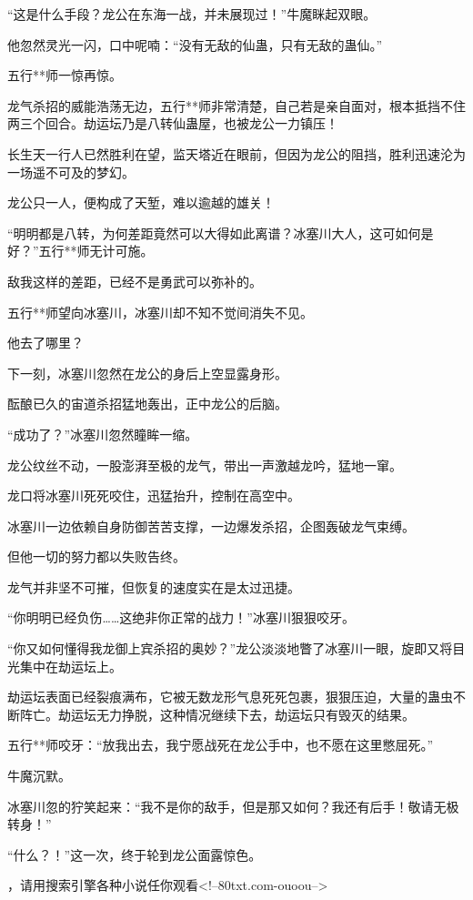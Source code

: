 \begin{this_body}
“这是什么手段？龙公在东海一战，并未展现过！”牛魔眯起双眼。

他忽然灵光一闪，口中呢喃：“没有无敌的仙蛊，只有无敌的蛊仙。”

五行**师一惊再惊。

龙气杀招的威能浩荡无边，五行**师非常清楚，自己若是亲自面对，根本抵挡不住两三个回合。劫运坛乃是八转仙蛊屋，也被龙公一力镇压！

长生天一行人已然胜利在望，监天塔近在眼前，但因为龙公的阻挡，胜利迅速沦为一场遥不可及的梦幻。

龙公只一人，便构成了天堑，难以逾越的雄关！

“明明都是八转，为何差距竟然可以大得如此离谱？冰塞川大人，这可如何是好？”五行**师无计可施。

敌我这样的差距，已经不是勇武可以弥补的。

五行**师望向冰塞川，冰塞川却不知不觉间消失不见。

他去了哪里？

下一刻，冰塞川忽然在龙公的身后上空显露身形。

酝酿已久的宙道杀招猛地轰出，正中龙公的后脑。

“成功了？”冰塞川忽然瞳眸一缩。

龙公纹丝不动，一股澎湃至极的龙气，带出一声激越龙吟，猛地一窜。

龙口将冰塞川死死咬住，迅猛抬升，控制在高空中。

冰塞川一边依赖自身防御苦苦支撑，一边爆发杀招，企图轰破龙气束缚。

但他一切的努力都以失败告终。

龙气并非坚不可摧，但恢复的速度实在是太过迅捷。

“你明明已经负伤……这绝非你正常的战力！”冰塞川狠狠咬牙。

“你又如何懂得我龙御上宾杀招的奥妙？”龙公淡淡地瞥了冰塞川一眼，旋即又将目光集中在劫运坛上。

劫运坛表面已经裂痕满布，它被无数龙形气息死死包裹，狠狠压迫，大量的蛊虫不断阵亡。劫运坛无力挣脱，这种情况继续下去，劫运坛只有毁灭的结果。

五行**师咬牙：“放我出去，我宁愿战死在龙公手中，也不愿在这里憋屈死。”

牛魔沉默。

冰塞川忽的狞笑起来：“我不是你的敌手，但是那又如何？我还有后手！敬请无极转身！”

“什么？！”这一次，终于轮到龙公面露惊色。

，请用搜索引擎各种小说任你观看<!--80txt.com-ouoou-->

\end{this_body}

